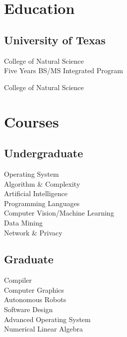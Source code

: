 \documentclass[]{deedy-resume-openfont}
\begin{document}
\begin{minipage}[t]{0.33\textwidth}


\section{Education}

\subsection{University of Texas}

\vspace{\topsep} %

College of Natural Science \\
Five Years BS/MS Integrated Program \\
\sectionsep

College of Natural Science \\
\sectionsep



\section{Courses}

\subsection{Undergraduate}
Operating System \\
Algorithm \& Complexity \\
Artificial Intelligence \\
Programming Languages \\
Computer Vision/Machine Learning \\
Data Mining \\
Network \& Privacy \\

\sectionsep

\subsection{Graduate}
Compiler \\
Computer Graphics \\
Autonomous Robots \\
Software Design \\
Advanced Operating System \\
Numerical Linear Algebra \\


\end{minipage}
\end{document}

